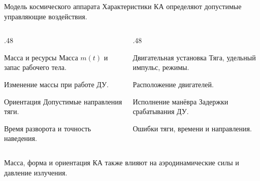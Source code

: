 \documentclass[11pt,aspectratio=169,t]{beamer}
\begin{document}
\begin{frame}{Модель космического аппарата}
Характеристики КА определяют допустимые управляющие воздействия.
\begin{columns}[T,onlytextwidth]
\begin{column}{.48\textwidth}
\begin{block}{Масса и ресурсы}
Масса $m(t)$ и запас рабочего тела.\par
Изменение массы при работе ДУ.
\end{block}
\begin{block}{Ориентация}
Допустимые направления тяги.\par
Время разворота и точность наведения.
\end{block}
\end{column}
\begin{column}{.48\textwidth}
\begin{block}{Двигательная установка}
Тяга, удельный импульс, режимы.\par
Расположение двигателей.
\end{block}
\begin{block}{Исполнение манёвра}
Задержки срабатывания ДУ.\par
Ошибки тяги, времени и направления.
\end{block}
\end{column}
\end{columns}
\smallskip
Масса, форма и ориентация КА также влияют на аэродинамические силы и давление излучения.
\end{frame}
\end{document}
